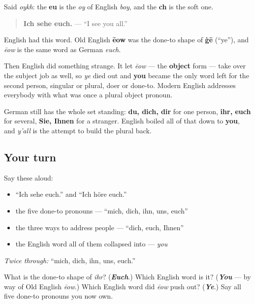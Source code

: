 Said \emph{oykh}: the \textbf{eu} is the \emph{oy} of English \emph{boy}, and the \textbf{ch} is the soft one.

\begin{quote}
\textbf{Ich sehe euch.} — \textquotedblleft{}I see you all.\textquotedblright{}
\end{quote}

\begin{cousinweb}
English had this word. Old English \textbf{ēow} was the done-to shape of \textbf{ġē} (\textquotedblleft{}ye\textquotedblright{}), and \emph{ēow} is the same word as German \emph{euch}.

Then English did something strange. It let \emph{ēow} — the \textbf{object} form — take over the subject job as well, so \emph{ye} died out and \textbf{you} became the only word left for the second person, singular or plural, doer or done-to. Modern English addresses everybody with what was once a plural object pronoun.

German still has the whole set standing: \textbf{du, dich, dir} for one person, \textbf{ihr, euch} for several, \textbf{Sie, Ihnen} for a stranger. English boiled all of that down to \textbf{you}, and \emph{y'all} is the attempt to build the plural back.
\end{cousinweb}

\subsection*{Your turn}
Say these aloud:

\begin{itemize}
\raggedright
  \item \textquotedblleft{}Ich sehe euch.\textquotedblright{} and \textquotedblleft{}Ich höre euch.\textquotedblright{}
  \item the five done-to pronouns — \textquotedblleft{}mich, dich, ihn, uns, euch\textquotedblright{}
  \item the three ways to address people — \textquotedblleft{}dich, euch, Ihnen\textquotedblright{}
  \item the English word all of them collapsed into — \emph{you}
\end{itemize}

\emph{Twice through:} \textquotedblleft{}mich, dich, ihn, uns, euch.\textquotedblright{}

\begin{tcolorbox}[breakable,colback=teal!4,colframe=teal!35!black,title={Before you move on}]
What is the done-to shape of \emph{ihr}? (\emph{\textbf{Euch}}.) Which English word is it? (\emph{\textbf{You}} — by way of Old English \emph{ēow}.) Which English word did \emph{ēow} push out? (\emph{\textbf{Ye}}.) Say all five done-to pronouns you now own.
\end{tcolorbox}
